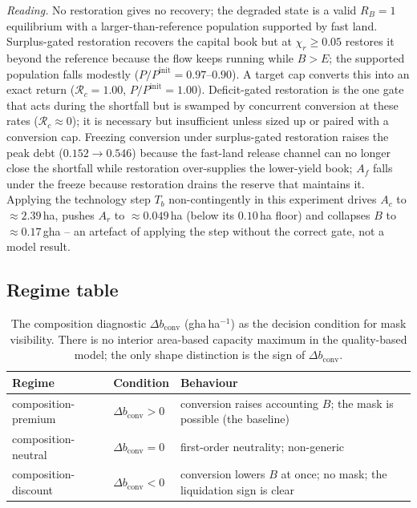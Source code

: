 \documentclass[11pt,a4paper]{article}
\newcommand{\dconv}{\Delta b_{\mathrm{conv}}}
\begin{document}
\noindent\emph{Reading.} No restoration gives no recovery; the degraded state is a valid $R_B=1$ equilibrium with a larger-than-reference population supported by fast land. Surplus-gated restoration recovers the capital book but at $\chi_r\ge0.05$ restores it beyond the reference because the flow keeps running while $B>E$; the supported population falls modestly ($P/P^{\mathrm{init}}=0.97$--$0.90$). A target cap converts this into an exact return ($\mathcal R_c=1.00$, $P/P^{\mathrm{init}}=1.00$). Deficit-gated restoration is the one gate that acts during the shortfall but is swamped by concurrent conversion at these rates ($\mathcal R_c\approx0$); it is necessary but insufficient unless sized up or paired with a conversion cap. Freezing conversion under surplus-gated restoration raises the peak debt ($0.152\to0.546$) because the fast-land release channel can no longer close the shortfall while restoration over-supplies the lower-yield book; $A_f$ falls under the freeze because restoration drains the reserve that maintains it. Applying the technology step $T_b$ non-contingently in this experiment drives $A_c$ to $\approx2.39$\,ha, pushes $A_r$ to $\approx0.049$\,ha (below its $0.10$\,ha floor) and collapses $B$ to $\approx0.17$\,gha -- an artefact of applying the step without the correct gate, not a model result.

\subsection{Regime table}\label{si:regimes}

\begin{table}[H]
\centering\small
\caption{The composition diagnostic $\dconv$ (gha\,ha$^{-1}$) as the decision condition for mask visibility. There is no interior area-based capacity maximum in the quality-based model; the only shape distinction is the sign of $\dconv$.}
\label{tab:si_regime}
\begin{tabularx}{\textwidth}{l l X}
\toprule
Regime & Condition & Behaviour \\
\midrule
composition-premium & $\dconv>0$ & conversion raises accounting $B$; the mask is possible (the baseline) \\
composition-neutral & $\dconv=0$ & first-order neutrality; non-generic \\
composition-discount & $\dconv<0$ & conversion lowers $B$ at once; no mask; the liquidation sign is clear \\
\bottomrule
\end{tabularx}
\end{table}
\end{document}
